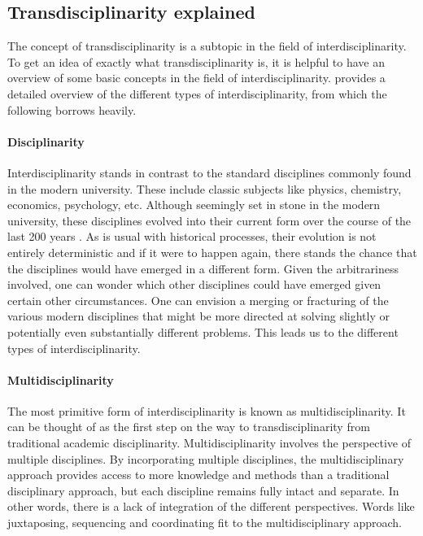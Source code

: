 \documentclass[a4paper]{article}
\begin{document}
\subsection{Transdisciplinarity explained}

The concept of transdisciplinarity is a subtopic in the field of
interdisciplinarity. To get an idea of exactly what transdisciplinarity is, it
is helpful to have an overview of some basic concepts in the field of
interdisciplinarity. \cite{klein2010taxonomy} provides a detailed overview of
the different types of interdisciplinarity, from which the following borrows
heavily.

\paragraph{Disciplinarity}

Interdisciplinarity stands in contrast to the standard disciplines commonly
found in the modern university. These include classic subjects like physics,
chemistry, economics, psychology, etc. Although seemingly set in stone in the
modern university, these disciplines evolved into their current form over the
course of the last 200 years \citep{weingart2010short}. As is usual with
historical processes, their evolution is not entirely deterministic and if it
were to happen again, there stands the chance that the disciplines would have
emerged in a different form. Given the arbitrariness involved, one can wonder
which other disciplines could have emerged given certain other circumstances.
One can envision a merging or fracturing of the various modern disciplines
that might be more directed at solving slightly or potentially even
substantially different problems. This leads us to the different types of
interdisciplinarity.

\paragraph{Multidisciplinarity}

The most primitive form of interdisciplinarity is known as
multidisciplinarity. It can be thought of as the first step on the way to
transdisciplinarity from traditional academic disciplinarity.
Multidisciplinarity involves the perspective of multiple disciplines. By
incorporating multiple disciplines, the multidisciplinary approach provides
access to more knowledge and methods than a traditional disciplinary approach,
but each discipline remains fully intact and separate. In other words, there
is a lack of integration of the different perspectives. Words like
juxtaposing, sequencing and coordinating fit to the multidisciplinary
approach.
\end{document}
